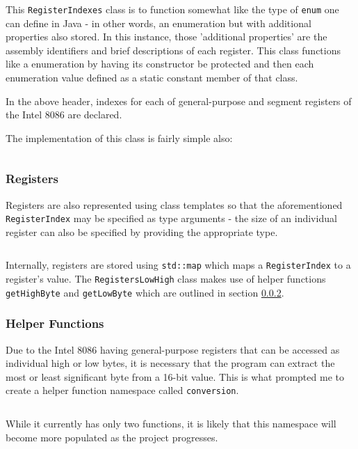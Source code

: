         \inputminted{c++}{code/initial/registerindexes.hpp}

        This \texttt{RegisterIndexes} class is to function somewhat like the type of \texttt{enum} one can define in Java - in other words, an enumeration but with additional properties also stored. In this instance, those 'additional properties' are the assembly identifiers and brief descriptions of each register. This class functions like a enumeration by having its constructor be protected and then each enumeration value defined as a static constant member of that class.

        In the above header, indexes for each of general-purpose and segment registers of the Intel 8086 are declared.

        The implementation of this class is fairly simple also:

        \inputminted{c++}{code/initial/registerindexes.cpp}

    \subsubsection{Registers}
        Registers are also represented using class templates so that the aforementioned \texttt{RegisterIndex} may be specified as type arguments - the size of an individual register can also be specified by providing the appropriate type.

        \inputminted{c++}{code/initial/registers.hpp}

        Internally, registers are stored using \texttt{std::map} which maps a \texttt{RegisterIndex} to a register's value. The \texttt{RegistersLowHigh} class makes use of helper functions \texttt{getHighByte} and \texttt{getLowByte} which are outlined in section \ref{sec:initial-helper-functions}.

    \subsubsection{Helper Functions} \label{sec:initial-helper-functions}
        Due to the Intel 8086 having general-purpose registers that can be accessed as individual high or low bytes, it is necessary that the program can extract the most or least significant byte from a 16-bit value. This is what prompted me to create a helper function namespace called \texttt{conversion}.

        \inputminted{c++}{code/initial/conversion.hpp}

        While it currently has only two functions, it is likely that this namespace will become more populated as the project progresses.

